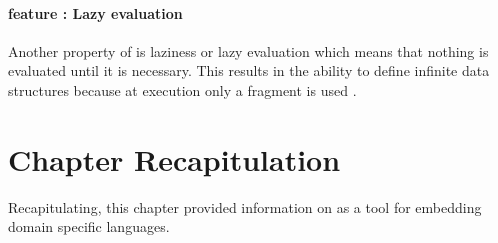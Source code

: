 \documentclass[thesis-solanki.tex]{subfiles}
\begin{document}
\paragraph{ feature : Lazy evaluation}
Another property of  is laziness or lazy evaluation which means that nothing is evaluated until
it is necessary.
This results in the ability to define infinite data structures because at execution only a fragment is used
\cite{website:haskelllazinesswiki}.



\section{Chapter Recapitulation}
Recapitulating, this chapter provided information on  as a tool for embedding domain specific languages.


\ifMain
\begin{scope}
  \nolinenumbers
  \enotesize
  \par
  \begin{singlespace}
  \setlength{\parskip}{12pt plus 2pt minus 1pt}
  \theendnotes
  \par
  \end{singlespace}
\end{scope}
\fi
\end{document}
